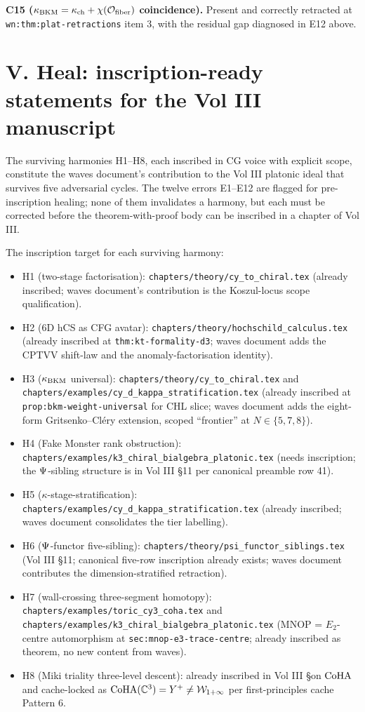 \textbf{C15 ($\kappa_{\mathrm{BKM}} = \kappa_{\mathrm{ch}} + \chi(\mathcal{O}_{\mathrm{fiber}})$ coincidence).}
Present and correctly retracted at \verb|wn:thm:plat-retractions|
item 3, with the residual gap diagnosed in E12 above.

\section{V. Heal: inscription-ready statements for the Vol III manuscript}
\label{wn:sec:wave17-agent15-heal}

The surviving harmonies H1--H8, each inscribed in CG voice with
explicit scope, constitute the waves document's contribution to the
Vol III platonic ideal that survives five adversarial cycles. The
twelve errors E1--E12 are flagged for pre-inscription healing; none
of them invalidates a harmony, but each must be corrected before the
theorem-with-proof body can be inscribed in a chapter of Vol III.

The inscription target for each surviving harmony:
\begin{itemize}
\item H1 (two-stage factorisation): \verb|chapters/theory/cy_to_chiral.tex|
(already inscribed; waves document's contribution is the Koszul-locus
scope qualification).
\item H2 (6D hCS as CFG avatar): \verb|chapters/theory/hochschild_calculus.tex|
(already inscribed at \verb|thm:kt-formality-d3|; waves document adds
the CPTVV shift-law and the anomaly-factorisation identity).
\item H3 ($\kappa_{\mathrm{BKM}}$ universal): \verb|chapters/theory/cy_to_chiral.tex|
and \verb|chapters/examples/cy_d_kappa_stratification.tex| (already
inscribed at \verb|prop:bkm-weight-universal| for CHL slice;
waves document adds the eight-form Gritsenko--Cl\'ery extension,
scoped ``frontier'' at $N \in \{5, 7, 8\}$).
\item H4 (Fake Monster rank obstruction):
\verb|chapters/examples/k3_chiral_bialgebra_platonic.tex|
(needs inscription; the $\Psi$-sibling structure is in Vol III
\S11 per canonical preamble row 41).
\item H5 ($\kappa$-stage-stratification):
\verb|chapters/examples/cy_d_kappa_stratification.tex|
(already inscribed; waves document consolidates the tier labelling).
\item H6 ($\Psi$-functor five-sibling):
\verb|chapters/theory/psi_functor_siblings.tex| (Vol III \S11;
canonical five-row inscription already exists; waves document
contributes the dimension-stratified retraction).
\item H7 (wall-crossing three-segment homotopy):
\verb|chapters/examples/toric_cy3_coha.tex| and
\verb|chapters/examples/k3_chiral_bialgebra_platonic.tex|
(MNOP = $E_2$-centre automorphism at
\verb|sec:mnop-e3-trace-centre|; already inscribed as theorem, no
new content from waves).
\item H8 (Miki triality three-level descent): already inscribed in
Vol III \S on $\mathrm{CoHA}$ and cache-locked as
$\mathrm{CoHA}(\mathbb{C}^3) = Y^+ \ne \mathcal{W}_{1+\infty}$ per first-principles cache Pattern 6.
\end{itemize}

